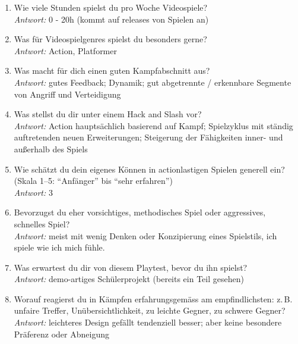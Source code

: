 \documentclass[../Main.tex]{subfiles}
\begin{document}
\begin{enumerate}[label=\textbf{P\arabic*}, leftmargin=1.5cm, itemsep=0.8em]
    \item Wie viele Stunden spielst du pro Woche Videospiele? \\
    \textit{Antwort:} 0 - 20h (kommt auf releases von Spielen an)

    \item Was für Videospielgenres spielst du besonders gerne? \\
    \textit{Antwort:} Action, Platformer

    \item Was macht für dich einen guten Kampfabschnitt aus? \\
    \textit{Antwort:} gutes Feedback; Dynamik; gut abgetrennte / erkennbare Segmente von Angriff und Verteidigung

    \item Was stellst du dir unter einem Hack and Slash vor? \\
    \textit{Antwort:} Action hauptsächlich basierend auf Kampf; Spielzyklus mit ständig auftretenden neuen Erweiterungen; Steigerung der Fähigkeiten inner- und außerhalb des Spiels

    \item Wie schätzt du dein eigenes Können in actionlastigen Spielen generell ein? (Skala 1--5: \enquote{Anfänger} bis \enquote{sehr erfahren}) \\
    \textit{Antwort:} 3

    \item Bevorzugst du eher vorsichtiges, methodisches Spiel oder aggressives, schnelles Spiel? \\
    \textit{Antwort:} meist mit wenig Denken oder Konzipierung eines Spielstils, ich spiele wie ich mich fühle.

    \item Was erwartest du dir von diesem Playtest, bevor du ihn spielst? \\
    \textit{Antwort:} demo-artiges Schülerprojekt (bereits ein Teil gesehen)

    \item Worauf reagierst du in Kämpfen erfahrungsgemäss am empfindlichsten: z.\,B. unfaire Treffer, Unübersichtlichkeit, zu leichte Gegner, zu schwere Gegner? \\
    \textit{Antwort:} leichteres Design gefällt tendenziell besser; aber keine besondere Präferenz oder Abneigung
\end{enumerate}
\end{document}
